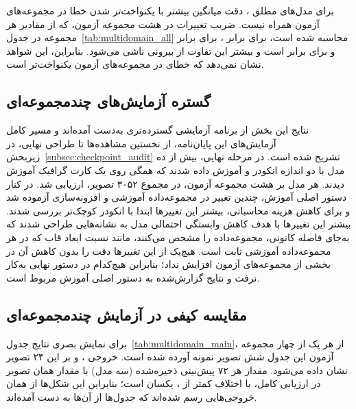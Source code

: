 برای مدل‌های مطلق ، دقت میانگین بیشتر \proposedmodel{} با یکنواخت‌تر شدن خطا در مجموعه‌های آزمون همراه نیست. ضریب تغییرات  در هشت مجموعه آزمون، که از مقادیر هر مجموعه در جدول~\ref{tab:multidomain_all} محاسبه شده است، برای \proposedmodel{} برابر ، برای \controlmodel{} برابر  و برای \publishedbasemodel{} برابر  است و بیشتر این تفاوت از  بیرونی ناشی می‌شود. بنابراین، این شواهد نشان نمی‌دهد که خطای \proposedmodel{} در مجموعه‌های آزمون یکنواخت‌تر است.

\subsection[گستره آزمایش‌های چندمجموعه‌ای]{گستره آزمایش‌های چندمجموعه‌ای}
\label{subsec:md_campaign}

نتایج این بخش از برنامه آزمایشی گسترده‌تری به‌دست آمده‌اند و مسیر کامل آزمایش‌های این پایان‌نامه، از نخستین مشاهده‌ها تا طراحی نهایی، در زیربخش~\ref{subsec:checkpoint_audit} تشریح شده است. در مرحله نهایی، بیش از ده مدل با دو اندازه انکودر  و  آموزش داده شدند که همگی روی یک کارت گرافیک  آموزش دیدند. هر مدل بر هشت مجموعه آزمون، در مجموع ۳۰۵۲ تصویر، ارزیابی شد. در کنار دستور اصلی آموزش، چندین تغییر در مجموعه‌داده آموزشی و افزونه‌سازی آزموده شد و برای کاهش هزینه محاسباتی، بیشتر این تغییرها ابتدا با انکودر کوچک‌تر  بررسی شدند. بیشتر این تغییرها با هدف کاهش وابستگی احتمالی مدل به نشانه‌هایی طراحی شدند که به‌جای فاصله کانونی، مجموعه‌داده را مشخص می‌کنند، مانند نسبت ابعاد قاب که در هر مجموعه‌داده آموزشی ثابت است. هیچ‌یک از این تغییرها دقت را بدون کاهش آن در بخشی از مجموعه‌های آزمون افزایش نداد؛ بنابراین هیچ‌کدام در دستور نهایی به‌کار نرفت و نتایج گزارش‌شده به دستور اصلی آموزش مربوط است.

\subsection[مقایسه کیفی در آزمایش چندمجموعه‌ای]{مقایسه کیفی در آزمایش چندمجموعه‌ای}
\label{subsec:qualitative_multidomain}

برای نمایش بصری نتایج جدول~\ref{tab:multidomain_main}، از هر یک از چهار مجموعه آزمون این جدول شش تصویر نمونه آورده شده است. خروجی \proposedmodel{}، \controlmodel{} و \publishedbasemodel{} بر این ۲۴ تصویر نشان داده می‌شود. مقدار  هر ۷۲ پیش‌بینی ذخیره‌شده (سه مدل) با مقدار همان تصویر در ارزیابی کامل، با اختلاف کمتر از ، یکسان است؛ بنابراین این شکل‌ها از همان خروجی‌هایی رسم شده‌اند که جدول‌ها از آن‌ها به دست آمده‌اند.


